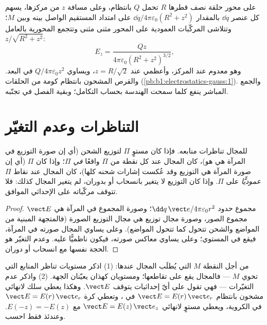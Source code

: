\begin{example}\label{ex:b1:electrostatics-gauss:ring}
على محور حلقة نصف قطرها $R$ تحمل $Q$ بانتظام، وعلى مسافة
$z$ من مركزها، يسهم كل عنصر $\dd q$ بالمقدار $\dd q/4\pi\varepsilon_0(R^2 +
z^2)$ على امتداد المستقيم الواصل بينه وبين $M$؛ وتتلاشى المركّبات العمودية
على المحور مثنى مثنى وتتجمع المحورية بالعامل
$z/\sqrt{R^2 + z^2}$:
\[
E_z = \frac{Qz}{4\pi\varepsilon_0(R^2 + z^2)^{3/2}} ,
\]
وهو معدوم عند المركز، وأعظمي عند $z = R/\sqrt2$، ويساوي $Q/4\pi\varepsilon_0z^2$ في
البعد. والقرص المشحون بانتظام كومة من الحلقات (\cref{pb:b1:electrostatics-gauss:1}).
والجمع المباشر ينفع كلما سمحت الهندسة بحساب التكامل؛ وبقية
الفصل في تجنّبه.
\end{example}

\section{التناظرات وعدم التغيّر}

\begin{proposition}\label{prop:b1:electrostatics-gauss:symmetry}
للمجال تناظرات منابعه. فإذا كان مستوٍ $\Pi$ \emph{}
لتوزيع الشحن (أي إن صورة التوزيع في المرآة هي هو)،
كان المجال عند كل نقطة من $\Pi$ واقعًا \emph{في} $\Pi$؛ وإذا كان $\Pi$
\emph{} (أي إن صورة المرآة هي التوزيع
وقد عُكست إشارات شحنه كلها)، كان المجال عند نقاط $\Pi$
\emph{عموديًّا} على $\Pi$. وإذا كان التوزيع لا يتغير بانسحاب أو بدوران،
لم يتغير المجال كذلك: فلا تتوقف مركّباته على الإحداثي الموافق.
\end{proposition}

\begin{proof}
$\vect E$ مجموع حدود $\dd q\,\vect e/4\pi\varepsilon_0r^2$؛ وصورة المجموع في
المرآة هي مجموع الصور، وصورة مجال
توزيع هي مجال التوزيع الصورة (فالمتجهة المبنية
من المواضع والشحن تتحول كما تتحول المواضع). وعلى
 يساوي المجال صورته في المرآة، فيقع في
المستوي؛ وعلى  يساوي معاكس صورته،
فيكون ناظميًّا عليه. وعدم التغيّر هو الحجة نفسها مع
انسحاب أو دوران.
\end{proof}

\begin{method}\label{meth:b1:electrostatics-gauss:symmetry}
من أجل النقطة $M$ التي يُطلَب المجال عندها: (1) اذكر مستويات
تناظر المنابع التي تحوي $M$ --- فالمجال يقع على
تقاطعها؛ ومستويان كهذان يعيّنان الجهة. (2) واذكر
عدم التغيّرات --- فهي تقول على أيّ إحداثيات يتوقف $\vect E$. وهكذا يعطي
سلك لانهائي مشحون بانتظام $\vect E = E(r)\,\vect e_r$ في
، وتعطي كرة $\vect E = E(r)\,\vect e_r$ في
الكروية، ويعطي مستوٍ لانهائي $\vect E = E(z)\,\vect e_z$ مع $E(-z) = -E(z)$.
وعندئذ فقط احسب.
\end{method}

